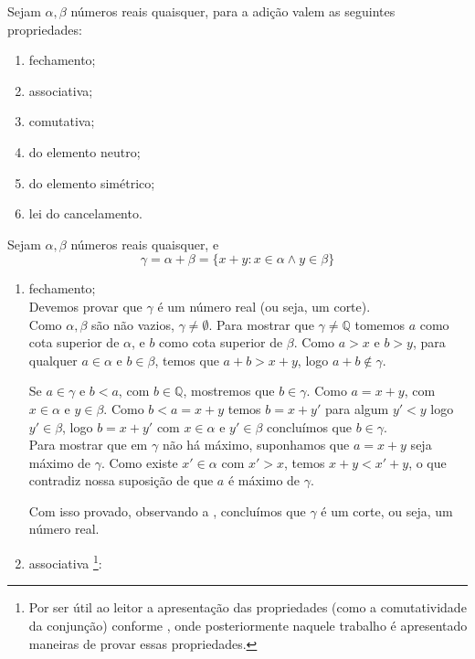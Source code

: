 \documentclass[../main.tex]{subfiles}
\begin{document}
\begin{prop}\label{reais-prop-adicao}{Sejam $\alpha, \beta$ números reais quaisquer, para a adição valem as seguintes propriedades:}
    \begin{enumerate}[label=(\roman*)]
        \item fechamento;
        \item associativa;
        \item comutativa;
        \item do elemento neutro; 
        \item do elemento simétrico;
        \item lei do cancelamento.
    \end{enumerate}
\end{prop}
\begin{dem}
    Sejam $\alpha, \beta$ números reais quaisquer, e \[ \gamma = \alpha + \beta = \{ x + y : x \in \alpha \land y \in \beta \} \]
    \begin{enumerate}[label=(\roman*)]
        \item fechamento; \\
            Devemos provar que $\gamma$ é um número real (ou seja, um corte). \\
            
            Como $\alpha, \beta$ são não vazios, $\gamma \neq \emptyset$. Para mostrar que $\gamma \neq \mathbb{Q}$ tomemos $a$ como cota superior de $\alpha$, e $b$ como cota superior de $\beta$. Como $a > x$ e $b > y$, para qualquer $a \in \alpha$ e $b \in \beta$, temos que $a + b > x + y$, logo $a+b \not\in \gamma$. 

            
            Se $a \in \gamma$ e $b < a$, com $b \in \mathbb{Q}$, mostremos que $b \in \gamma$. Como $a = x + y$, com $x \in \alpha$ e $y \in \beta$.
            Como $b < a = x + y$ temos $b = x + y'$ para algum $y' < y$ logo $y' \in \beta$, logo $b = x + y'$ com $x \in \alpha$ e $y' \in \beta$ concluímos que $b \in \gamma$. \\

            Para mostrar que em $\gamma$ não há máximo, suponhamos que $a = x + y$ seja máximo de $\gamma$. Como existe $x' \in \alpha$ com $x' > x$, temos $x + y < x' + y$, o que contradiz nossa suposição de que $a$ é máximo de $\gamma$.

            Com isso provado, observando a , concluímos que $\gamma$ é um corte, ou seja, um número real.
        
        \item associativa \footnote{Por ser útil ao leitor a apresentação das propriedades (como a comutatividade da conjunção) conforme \textcite[p. 147]{mortari}, onde posteriormente naquele trabalho é apresentado maneiras de provar essas propriedades.}: 


\end{enumerate}
\end{dem}
\end{document}
